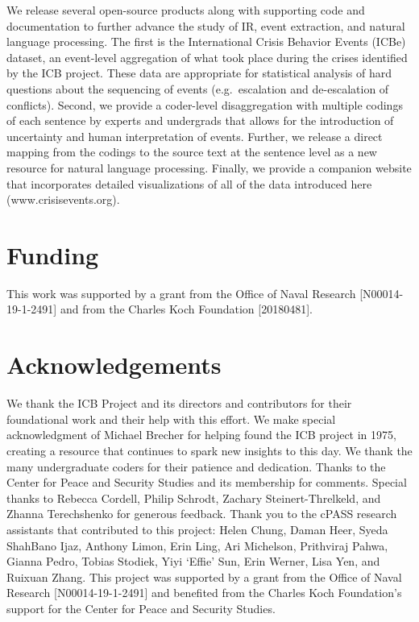 \documentclass{article}
\begin{document}
We release several open-source products along with supporting code and
documentation to further advance the study of IR, event extraction, and
natural language processing. The first is the International Crisis
Behavior Events (ICBe) dataset, an event-level aggregation of what took
place during the crises identified by the ICB project. These data are
appropriate for statistical analysis of hard questions about the
sequencing of events (e.g.~escalation and de-escalation of conflicts).
Second, we provide a coder-level disaggregation with multiple codings of
each sentence by experts and undergrads that allows for the introduction
of uncertainty and human interpretation of events. Further, we release a
direct mapping from the codings to the source text at the sentence level
as a new resource for natural language processing. Finally, we provide a
companion website that incorporates detailed visualizations of all of
the data introduced here (www.crisisevents.org).

\hypertarget{format}{%
\section*{Funding}\label{format}}

This work was supported by a grant from the Office of Naval Research
{[}N00014-19-1-2491{]} and from the Charles Koch Foundation
{[}20180481{]}.

\hypertarget{format}{%
\section*{Acknowledgements}\label{format}}

We thank the ICB Project and its directors and contributors for their
foundational work and their help with this effort. We make special
acknowledgment of Michael Brecher for helping found the ICB project in
1975, creating a resource that continues to spark new insights to this
day. We thank the many undergraduate coders for their patience and
dedication. Thanks to the Center for Peace and Security Studies and its
membership for comments. Special thanks to Rebecca Cordell, Philip
Schrodt, Zachary Steinert-Threlkeld, and Zhanna Terechshenko for
generous feedback. Thank you to the cPASS research assistants that
contributed to this project: Helen Chung, Daman Heer, Syeda ShahBano
Ijaz, Anthony Limon, Erin Ling, Ari Michelson, Prithviraj Pahwa, Gianna
Pedro, Tobias Stodiek, Yiyi `Effie' Sun, Erin Werner, Lisa Yen, and
Ruixuan Zhang. This project was supported by a grant from the Office of
Naval Research {[}N00014-19-1-2491{]} and benefited from the Charles
Koch Foundation's support for the Center for Peace and Security Studies.
\end{document}
